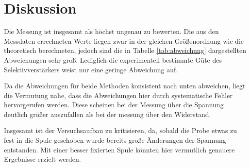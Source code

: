 \section{Diskussion}
\label{sec:Diskussion}

Die Messung ist insgesamt als höchst ungenau zu bewerten. Die aus den Messdaten errechneten
Werte liegen zwar in der gleichen Größenordnung wie die theoretisch berechneten,
jedoch sind die in Tabelle \ref{tab:abweichung} dargestellten Abweichungen sehr groß.
Lediglich die experimentell bestimmte Güte des Selektivverstärkers weist nur eine
geringe Abweichung auf.

Da die Abweichungen für beide Methoden konsistent nach
unten abweichen, liegt die Vermutung nahe, dass die Abweichungen hier durch
systematische Fehler hervorgerufen werden. Diese scheinen bei der Messung
über die Spannung deutlich größer auszufallen als bei der messung über den
Widerstand.

Insgesamt ist der Versuchsaufbau zu
kritisieren, da, sobald die Probe etwas zu fest in die Spule geschoben wurde bereits
große Änderungen der Spannung entstanden. Mit einer besser fixierten Spule könnten
hier vermutlich genauere Ergebnisse erzielt werden.

